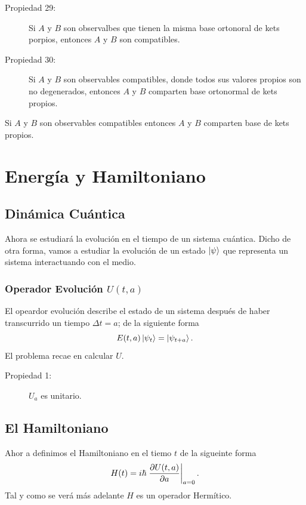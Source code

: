 \begin{description}
	\item[Propiedad 29: ] Si $A$ y $B$ son observalbes que tienen la misma base ortonoral de kets porpios, entonces $A$ y $B$ son compatibles.
	\item[Propiedad 30: ] Si $A$ y $B$ son observables compatibles, donde todos sus valores propios son no degenerados, entonces $A$ y $B$ comparten base ortonormal de kets propios.
\end{description}

\begin{teorema}
	Si $A$ y $B$ son observables compatibles entonces $A$ y $B$ comparten base de kets propios.
\end{teorema}







\chapter{Energía y Hamiltoniano}

\section{Dinámica Cuántica}
Ahora se estudiará la evolución en el tiempo de un sistema cuántica. Dicho de otra forma, vamos a estudiar la evolución de un estado $\ket{\psi}$ que representa un sistema interactuando con el medio.

\subsection{Operador Evolución $U(t,a)$}
El opeardor evolución describe el estado de un sistema después de haber transcurrido un tiempo $\Delta t=a$; de la siguiente forma
	$$ E(t,a) \ket{\psi_{t} } = \ket{\psi_{t+a} }. $$
El problema recae en calcular $U$.

\begin{description}
	\item[Propiedad 1: ] $U_a$ es unitario.
\end{description}


\section{El Hamiltoniano}
Ahor a definimos el Hamiltoniano en el tiemo $t$ de la sigueinte forma
	$$ H(t) = i\hbar \eval{\pdv{U(t,a)}{a}}_{a=0}. $$
Tal y como se verá más adelante $H$ es un operador Hermítico.

